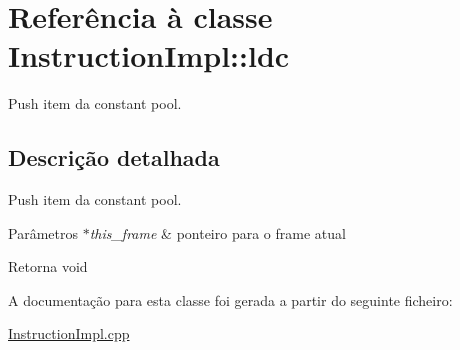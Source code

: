 \hypertarget{class_instruction_impl_1_1ldc}{}\section{Referência à classe Instruction\+Impl\+:\+:ldc}
\label{class_instruction_impl_1_1ldc}


Push item da constant pool.  




\subsection{Descrição detalhada}
Push item da constant pool. 


\begin{DoxyParams}{Parâmetros}
{\em $\ast$this\+\_\+frame} & ponteiro para o frame atual \\
\hline
\end{DoxyParams}
\begin{DoxyReturn}{Retorna}
void 
\end{DoxyReturn}


A documentação para esta classe foi gerada a partir do seguinte ficheiro\+:\begin{DoxyCompactItemize}
\item 
\hyperlink{_instruction_impl_8cpp}{Instruction\+Impl.\+cpp}\end{DoxyCompactItemize}

